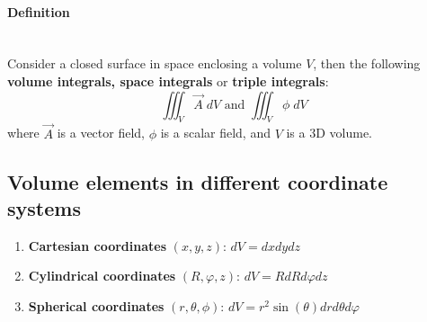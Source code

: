 \documentclass[11pt]{article}
\begin{document}
            \paragraph{Definition}\\
            Consider a closed surface in space enclosing a volume $V$, then the following \textbf{volume integrals, space integrals}
            or \textbf{triple integrals}:
            \begin{equation}
                \label{eq:equation10}
                \iiint_{V} \vec{A} \; dV \text{    and     } \iiint_{V} \phi \; dV
            \end{equation}
            where $\vec{A}$ is a vector field, $\phi$ is a scalar field, and $V$ is a 3D volume.
            \subsection{Volume elements in different coordinate systems}\label{subsec:volume-elements-in-different-coordinate-systems}
                \begin{enumerate}
                    \item \textbf{Cartesian coordinates} $(x,y,z)$: $dV = dx dy dz$
                    \item \textbf{Cylindrical coordinates} $(R,\varphi,z)$:  $dV = R dR d\varphi dz$
                    \item \textbf{Spherical coordinates} $(r, \theta, \phi)$: $dV = r^2 \sin(\theta) dr d\theta d\varphi$
                \end{enumerate}
\end{document}
